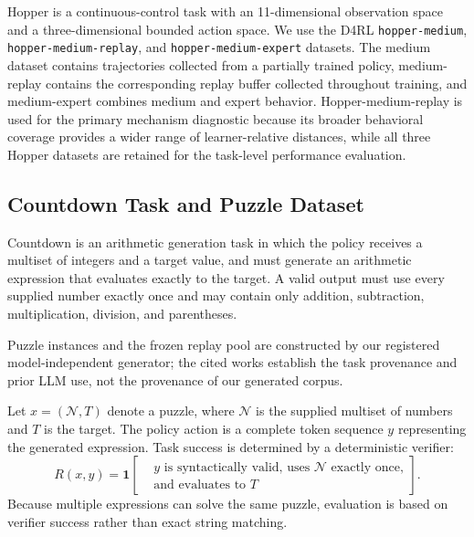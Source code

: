 \documentclass[sigconf,anonymous,review]{acmart}
\theoremstyle{acmdefinition}
\begin{document}
Hopper is a continuous-control task with an
11-dimensional observation space and a three-dimensional bounded action
space. We use the D4RL
\texttt{hopper-medium},
\texttt{hopper-medium-replay}, and
\texttt{hopper-medium-expert}
datasets. The medium dataset contains trajectories collected from a
partially trained policy, medium-replay contains the corresponding replay
buffer collected throughout training, and medium-expert combines medium
and expert behavior. Hopper-medium-replay is used for the primary mechanism
diagnostic because its broader behavioral coverage provides a wider range of
learner-relative distances, while all three Hopper datasets are retained for
the task-level performance evaluation.

\subsection{Countdown Task and Puzzle Dataset}
\label{app:countdown_dataset}

Countdown is an arithmetic generation task in which the policy receives
a multiset of integers and a target value, and must generate an
arithmetic expression that evaluates exactly to the target. A valid
output must use every supplied number exactly once and may contain only
addition, subtraction, multiplication, division, and parentheses.

Puzzle instances and the frozen replay pool are constructed by our
registered model-independent generator; the cited works establish
the task provenance and prior LLM use, not the provenance of our
generated corpus.

Let
$x=(\mathcal N,T)$
denote a puzzle, where
$\mathcal N$
is the supplied multiset of numbers and
$T$
is the target. The policy action is a complete token sequence
$y$ representing the generated expression. Task success is determined
by a deterministic verifier:
\begin{equation}
    R(x,y)
    =
    \mathbf 1
    \left[
    \begin{aligned}
        &y
        \text{ is syntactically valid, uses }
        \mathcal N
        \text{ exactly once,} \\
        &\text{and evaluates to }T
    \end{aligned}
    \right].
    \label{eq:countdown_reward}
\end{equation}
Because multiple expressions can solve the same puzzle, evaluation is
based on verifier success rather than exact string matching.
\end{document}
